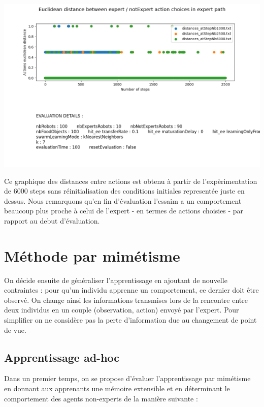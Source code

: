 \documentclass[a4paper, 12pt]{report}
\begin{document}
    \includegraphics[scale=0.5]{distances_knn.png}
    
    Ce graphique des distances entre actions est obtenu à partir de l'expèrimentation de 6000 steps sans réinitialisation des conditions initiales representée juste en dessus. Nous remarquons qu'en fin d'évaluation l'essaim a un comportement beaucoup plus proche à celui de l'expert - en termes de actions choisies - par rapport au debut d'évaluation.
    
    
    
    
    
	\section{Méthode par mimétisme}
	On décide ensuite de généraliser l'apprentissage en ajoutant de nouvelle contraintes : pour qu'un individu apprenne un comportement, ce dernier doit être observé. On change ainsi les informations transmises lors de la rencontre entre deux individus en un couple (observation, action) envoyé par l'expert.
	Pour simplifier on ne considère pas la perte d'information due au changement de point de vue.
	\subsection{Apprentissage ad-hoc}
	Dans un premier temps, on se propose d'évaluer l'apprentissage par mimétisme en donnant aux apprenants une mémoire extensible et en déterminant le comportement des agents non-experts de la manière suivante :

	
\end{document}
